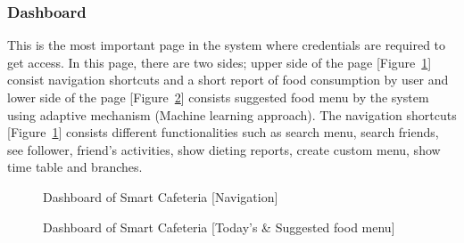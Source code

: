 \subsubsection{Dashboard}
\label{dashboardpage}
 This is the most important page in the system where credentials are required to
 get access. In this page, there are two sides; upper side of the page
 [Figure~\ref{PLdashboard}] consist navigation shortcuts and a short report of
  food consumption by user and lower side of the page
  [Figure~\ref{PLfoodmenusuggestion}] consists
 suggested food menu by the system using adaptive mechanism (Machine learning
 approach). The navigation shortcuts [Figure~\ref{PLdashboard}] consists
 different functionalities such as search menu, search friends, see follower,
 friend's activities, show dieting reports, create custom menu, show time table
 and branches.
 
\begin{figure}[h!t]
    \centering
  \caption{Dashboard of Smart Cafeteria [Navigation]}
  \label{PLdashboard}
\end{figure}

\begin{figure}[h!t]
    \centering
  \caption{Dashboard of Smart Cafeteria [Today's \& Suggested food menu]}
  \label{PLfoodmenusuggestion}
\end{figure}

